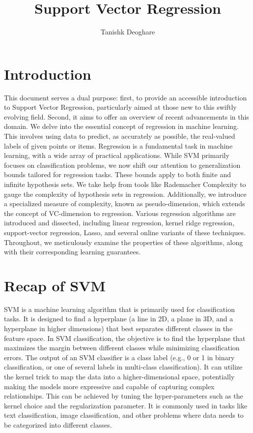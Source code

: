 \documentclass[fleqn,10pt]{olplainarticle}
\title{Support Vector Regression}
\author[1]{Tanishk Deoghare}
\affil[1]{Department of Financial Engineering New York University Tandon School of Engineering}
\begin{document}
\flushbottom
\maketitle
\thispagestyle{empty}

\section*{Introduction}

This document serves a dual purpose: first, to provide an accessible introduction to Support Vector Regression, particularly aimed at those new to this swiftly evolving field. Second, it aims to offer an overview of recent advancements in this domain. We delve into the essential concept of regression in machine learning. This involves using data to predict, as accurately as possible, the real-valued labels of given points or items. Regression is a fundamental task in machine learning, with a wide array of practical applications. While SVM primarily focuses on classification problems, we now shift our attention to generalization bounds tailored for regression tasks. These bounds apply to both finite and infinite hypothesis sets. We take help from tools like Rademacher Complexity to gauge the complexity of hypothesis sets in regression. Additionally, we introduce a specialized measure of complexity, known as pseudo-dimension, which extends the concept of VC-dimension to regression. Various regression algorithms are introduced and dissected, including linear regression, kernel ridge regression, support-vector regression, Lasso, and several online variants of these techniques. Throughout, we meticulously examine the properties of these algorithms, along with their corresponding learning guarantees.


\section*{Recap of SVM}
SVM is a machine learning algorithm that is primarily used for classification tasks. It is designed to find a hyperplane (a line in 2D, a plane in 3D, and a hyperplane in higher dimensions) that best separates different classes in the feature space. In SVM classification, the objective is to find the hyperplane that maximizes the margin between different classes while minimizing classification errors. The output of an SVM classifier is a class label (e.g., 0 or 1 in binary classification, or one of several labels in multi-class classification). It can utilize the kernel trick to map the data into a higher-dimensional space, potentially making the models more expressive and capable of capturing complex relationships. This can be achieved by tuning the hyper-parameters such as the kernel choice and the regularization parameter. It is commonly used in tasks like text classification, image classification, and other problems where data needs to be categorized into different classes. 
\end{document}
